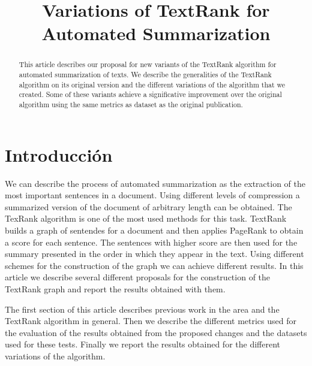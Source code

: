 \documentclass{llncs}
\begin{document}
\frontmatter

\title{Variations of TextRank for Automated Summarization}


\maketitle

\begin{abstract}
This article describes our proposal for new variants of the TextRank algorithm for automated summarization of texts. We describe the generalities of the TextRank algorithm on its original version and the different variations of the algorithm that we created. Some of these variants achieve a significative improvement over the original algorithm using the same metrics as dataset as the original publication. 

\end{abstract}

\section{Introducción}
We can describe the process of automated summarization as the extraction of the most important sentences in a document. Using different levels of compression a summarized version of the document of arbitrary length can be obtained. The TexRank algorithm is one of the most used methods for this task. TextRank builds a graph of sentendes for a document and then applies PageRank to obtain a score for each sentence. The sentences with higher score are then used for the summary presented in the order in which they appear in the text. Using different schemes for the construction of the graph we can achieve different results. In this article we describe several different proposals for the construction of the TextRank graph and report the results obtained with them.

The first section of this article describes previous work in the area and the TextRank algorithm in general. Then we describe the different metrics used for the evaluation of the results obtained from the proposed changes and the datasets used for these tests. Finally we report the results obtained for the different variations of the algorithm.
\end{document}
